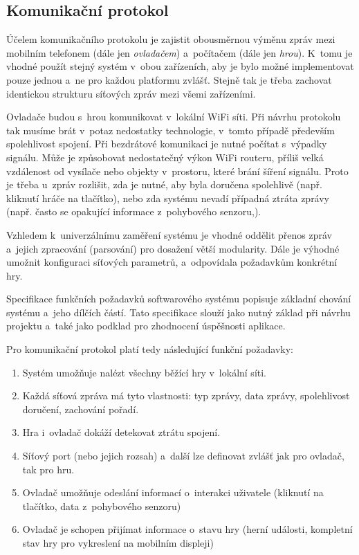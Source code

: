 \documentclass[thesis=B,czech,hidelinks]{FITthesis}[2012/06/26] %
\begin{document}
\subsection{Komunikační protokol}

Účelem komunikačního protokolu je zajistit obousměrnou výměnu zpráv mezi mobilním telefonem (dále jen \textit{ovladačem}) a~počítačem (dále jen \textit{hrou}). K~tomu je vhodné použít stejný systém v~obou zařízeních, aby je bylo možné implementovat pouze jednou a~ne pro každou platformu zvlášť. Stejně tak je třeba zachovat identickou strukturu síťových zpráv mezi všemi zařízeními.

Ovladače budou s~hrou komunikovat v~lokální WiFi síti. Při návrhu protokolu tak musíme brát v~potaz nedostatky technologie, v~tomto případě především spolehlivost spojení. Při bezdrátové komunikaci je nutné počítat s~výpadky signálu. Může je způsobovat nedostatečný výkon WiFi routeru, příliš velká vzdálenost od vysílače nebo objekty v~prostoru, které brání šíření signálu. Proto je třeba u~zpráv rozlišit, zda je nutné, aby byla doručena spolehlivě (např. kliknutí hráče na tlačítko), nebo zda systému nevadí případná ztráta zprávy (např. často se opakující informace z~pohybového senzoru,). 

Vzhledem k~univerzálnímu zaměření systému je vhodné oddělit přenos zpráv a~jejich zpracování (parsování) pro dosažení větší modularity. Dále je výhodné umožnit  konfiguraci síťových parametrů, a~odpovídala požadavkům konkrétní hry.

Specifikace funkčních požadavků softwarového systému popisuje základní chování systému a~jeho dílčích částí. Tato specifikace slouží jako nutný základ při návrhu projektu a~také jako podklad pro zhodnocení úspěšnosti aplikace. \cite{pozadavky}

Pro komunikační protokol platí tedy následující funkční požadavky:

\begin{enumerate}
	\item Systém umožňuje nalézt všechny běžící hry v~lokální síti.
	\item Každá síťová zpráva má tyto vlastnosti: typ zprávy, data zprávy, spolehlivost doručení, zachování pořadí.
	\item Hra i~ovladač dokáží detekovat ztrátu spojení.
	\item Síťový port (nebo jejich rozsah) a~další lze definovat zvlášť jak pro ovladač, tak pro hru.
	\item Ovladač umožňuje odeslání informací o~interakci uživatele (kliknutí na tlačítko, data z~pohybového senzoru)
	\item Ovladač je schopen přijímat informace o~stavu hry (herní události, kompletní stav hry pro vykreslení na mobilním displeji)
\end{enumerate}
\end{document}
